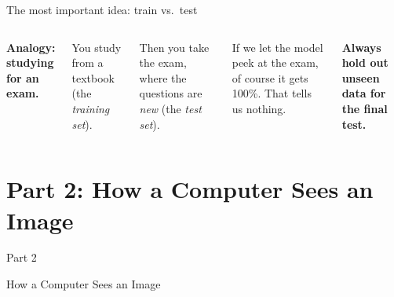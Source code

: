 \documentclass[aspectratio=169, 11pt]{beamer}
\begin{document}
\begin{frame}{The most important idea: train vs.\ test}
    \begin{columns}[T]
        \textbf{Analogy: studying for an exam.}

        \vspace{0.3cm}
        You study from a textbook (the \emph{training set}).

        \vspace{0.3cm}
        Then you take the exam, where the questions are \emph{new} (the \emph{test set}).

        \vspace{0.3cm}
        If we let the model peek at the exam, of course it gets 100\%. That tells us nothing.

        \vspace{0.4cm}
        \textcolor{ausred}{\textbf{Always hold out unseen data for the final test.}}

        \centering
    \end{columns}
\end{frame}

\section{Part 2: How a Computer Sees an Image}
\begin{frame}
    \centering
    \Huge \textcolor{ausred}{Part 2}

    \vspace{0.5cm}
    \LARGE How a Computer Sees an Image
\end{frame}
\end{document}
